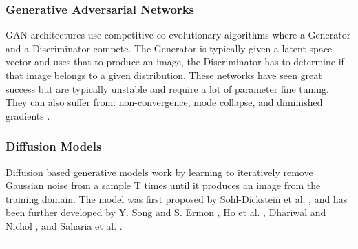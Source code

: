 \documentclass{UoYCSproject}
\begin{document}
\subsubsection{Generative Adversarial Networks}





GAN architectures\cite{goodfellow2014generative} use competitive co-evolutionary algorithms where a Generator and a Discriminator compete. The Generator is typically given a latent space vector and uses that to produce an image, the Discriminator has to determine if that image belongs to a given distribution. These networks have seen great success \cite{zhu2020unpaired, karras2019stylebased, isola2018imagetoimage} but are typically unstable and require a lot of parameter fine tuning. They can also suffer from: non-convergence, mode collapse, and diminished gradients \cite{goodfellow2017nips}.

\subsubsection{Diffusion Models}


Diffusion based generative models work by learning to iteratively remove Gaussian noise from a sample T times until it produces an image from the training domain. The model was first proposed by Sohl-Dickstein et al. \cite{sohldickstein2015deep}, and has been further developed by Y. Song and S. Ermon \cite{song2020generative}, Ho et al. \cite{ho2020denoising},  Dhariwal and Nichol \cite{dhariwal2021diffusion}, and Saharia et al. \cite{saharia2022palette}. 

\begin{center}
    \rule[1ex]{.5\textwidth}{.5pt}
\end{center}
\end{document}
